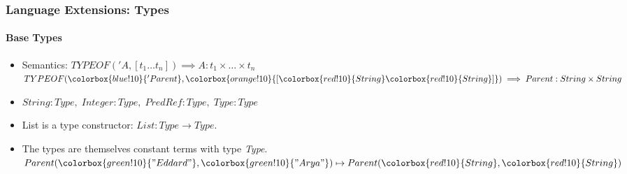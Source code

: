 \documentclass{beamer}
\newcommand{\strconst}[1]{ \colorbox{green!10}{#1} }
\newcommand{\predconst}[1]{ \colorbox{blue!10}{#1} }
\newcommand{\listconst}[1]{ \colorbox{orange!10}{#1} }
\newcommand{\typeconst}[1]{ \colorbox{red!10}{#1} }
\begin{document}
\begin{frame}
\frametitle{Language Extensions: Types}
\framesubtitle{Base Types}
\begin{itemize}
\item<2-> Semantics:  $TYPEOF('A, [t_1  \ldots  t_n]) \implies A : t_1 \times \ldots \times t_n$
 \footnotesize $TYPEOF(\predconst{'Parent}, \listconst{[\typeconst{String} \typeconst{String}]}) \implies Parent : String \times String$
\item<4-> $String : Type, \; Integer : Type, \; PredRef : Type, \; Type : Type$
\item<5-> List is a type constructor: $List : Type \rightarrow Type$.\\
\item<5-> The types are themselves constant terms with type \textit{Type}. 
\\
 {
	\vspace*{0.5cm}
	\hspace*{0.2cm}
	$Parent(\strconst{"Eddard"}, \strconst{"Arya"}) \mapsto Parent(\typeconst{String}, \typeconst{String})$
}
\end{itemize}
\end{frame}
\end{document}
